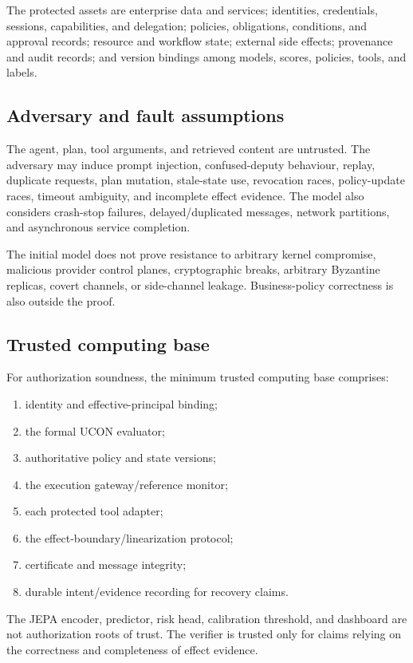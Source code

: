 \documentclass[11pt,a4paper]{article}
\theoremstyle{remark}
\begin{document}
The protected assets are enterprise data and services; identities, credentials, sessions, capabilities, and delegation; policies, obligations, conditions, and approval records; resource and workflow state; external side effects; provenance and audit records; and version bindings among models, scores, policies, tools, and labels.

\subsection{Adversary and fault assumptions}

The agent, plan, tool arguments, and retrieved content are untrusted. The adversary may induce prompt injection, confused-deputy behaviour, replay, duplicate requests, plan mutation, stale-state use, revocation races, policy-update races, timeout ambiguity, and incomplete effect evidence. The model also considers crash-stop failures, delayed/duplicated messages, network partitions, and asynchronous service completion.

The initial model does not prove resistance to arbitrary kernel compromise, malicious provider control planes, cryptographic breaks, arbitrary Byzantine replicas, covert channels, or side-channel leakage. Business-policy correctness is also outside the proof.

\subsection{Trusted computing base}

For authorization soundness, the minimum trusted computing base comprises:
\begin{enumerate}[leftmargin=2em]
\item identity and effective-principal binding;
\item the formal UCON evaluator;
\item authoritative policy and state versions;
\item the execution gateway/reference monitor;
\item each protected tool adapter;
\item the effect-boundary/linearization protocol;
\item certificate and message integrity;
\item durable intent/evidence recording for recovery claims.
\end{enumerate}

The JEPA encoder, predictor, risk head, calibration threshold, and dashboard are not authorization roots of trust. The verifier is trusted only for claims relying on the correctness and completeness of effect evidence.
\end{document}

